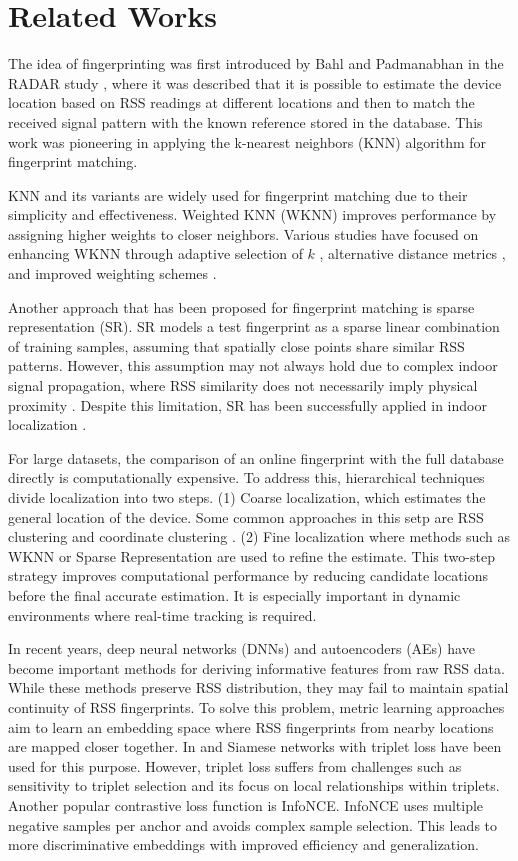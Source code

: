 \documentclass[journal,twoside,web]{ieeecolor}
\begin{document}
\section{Related Works}
The idea of fingerprinting was first introduced by Bahl and Padmanabhan in the RADAR study \cite{Bahl2000}, where it was described that it is possible to estimate the device location based on RSS readings at different locations and then to match the received signal pattern with the known reference stored in the database. This work was pioneering in applying the k-nearest neighbors (KNN) algorithm for fingerprint matching.

KNN and its variants are widely used for fingerprint matching due to their simplicity and effectiveness. Weighted KNN (WKNN) improves performance by assigning higher weights to closer neighbors. Various studies have focused on enhancing WKNN through adaptive selection of $k$ \cite{BMR_KNN}, alternative distance metrics \cite{ RLWKNN}, and improved weighting schemes \cite{WKNNW}.

Another approach that has been proposed for fingerprint matching is sparse representation (SR).
SR models a test fingerprint as a sparse linear combination of training samples, assuming that spatially close points share similar RSS patterns. However, this assumption may not always hold due to complex indoor signal propagation, where RSS similarity does not necessarily imply physical proximity \cite{WKNN7, ref1}. Despite this limitation, SR has been successfully applied in indoor localization \cite{STSR, SR2}.

For large datasets, the comparison of an online fingerprint with the full database directly is computationally expensive. To address this, hierarchical techniques divide localization into two steps. (1) Coarse localization, which estimates the general location of the device. Some common approaches in this setp are RSS clustering \cite{clustering} and coordinate clustering \cite{Two_step_localization1}. 
(2) Fine localization where methods such as WKNN or Sparse Representation \cite{SR2} are used to refine the estimate.
This two-step strategy improves computational performance by reducing candidate locations before the final accurate estimation. It is especially important in dynamic environments where real-time tracking is required.

In recent years, deep neural networks (DNNs) \cite{Lan2022} and autoencoders (AEs) \cite{Panja2024} have become important methods for deriving informative features from raw RSS data. While these methods preserve RSS distribution, they may fail to maintain spatial continuity of RSS fingerprints.
To solve this problem, metric learning approaches aim to learn an embedding space where RSS fingerprints from nearby locations are mapped closer together.
In \cite{Triplet1} and \cite{Triplet2} Siamese networks with triplet loss have been used for this purpose.
However, triplet loss suffers from challenges such as sensitivity to triplet selection and its focus on local relationships within triplets.
Another popular contrastive loss function is InfoNCE. InfoNCE uses multiple negative samples per anchor and avoids complex sample selection. This leads to more discriminative embeddings with improved efficiency and generalization.
\end{document}
